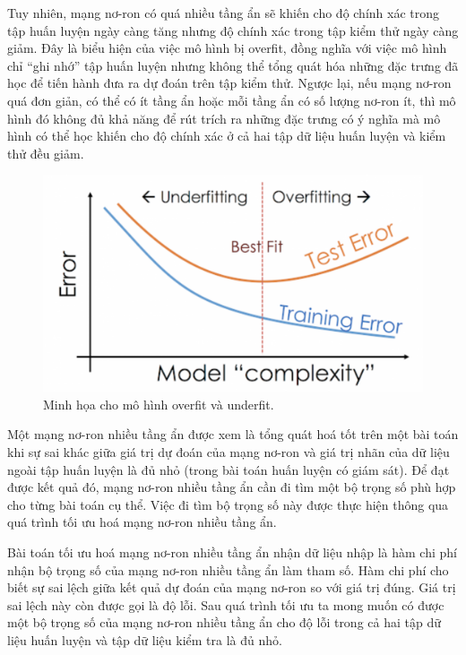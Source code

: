 Tuy nhiên, mạng nơ-ron có quá nhiều tầng ẩn sẽ khiến cho độ chính xác trong tập huấn luyện ngày càng tăng nhưng độ chính xác trong tập kiểm thử ngày càng giảm. Đây là biểu hiện của việc mô hình bị overfit, đồng nghĩa với việc mô hình chỉ ``ghi nhớ'' tập huấn luyện nhưng không thể tổng quát hóa những đặc trưng đã học để tiến hành đưa ra dự đoán trên tập kiểm thử. Ngược lại, nếu mạng nơ-ron quá đơn giản, có thể có ít tầng ẩn hoặc mỗi tầng ẩn có số lượng nơ-ron ít, thì mô hình đó không đủ khả năng để rút trích ra những đặc trưng có ý nghĩa mà mô hình có thể học khiến cho độ chính xác ở cả hai tập dữ liệu huấn luyện và kiểm thử đều giảm.

\begin{figure}[htp]
\centering
\includegraphics[width=100 mm]{images/under-over.png}
\caption{Minh họa cho mô hình overfit và underfit. \cite{underoverfit}}
\label{fig:under-over}
\end{figure}

Một mạng nơ-ron nhiều tầng ẩn được xem là tổng quát hoá tốt trên một bài toán khi sự sai khác giữa giá trị dự đoán của mạng nơ-ron và giá trị nhãn của dữ liệu ngoài tập huấn luyện là đủ nhỏ (trong bài toán huấn luyện có giám sát). Để đạt được kết quả đó, mạng nơ-ron nhiều tầng ẩn cần đi tìm một bộ trọng số phù hợp cho từng bài toán cụ thể. Việc đi tìm bộ trọng số này được thực hiện thông qua quá trình tối ưu hoá mạng nơ-ron nhiều tầng ẩn.

Bài toán tối ưu hoá mạng nơ-ron nhiều tầng ẩn nhận dữ liệu nhập là hàm chi phí nhận bộ trọng số của mạng nơ-ron nhiều tầng ẩn làm tham số. Hàm chi phí cho biết sự sai lệch giữa kết quả dự đoán của mạng nơ-ron so với giá trị đúng. Giá trị sai lệch này còn được gọi là độ lỗi. Sau quá trình tối ưu ta mong muốn có được một bộ trọng số của mạng nơ-ron nhiều tầng ẩn cho độ lỗi trong cả hai tập dữ liệu huấn luyện và tập dữ liệu kiểm tra là đủ nhỏ.

